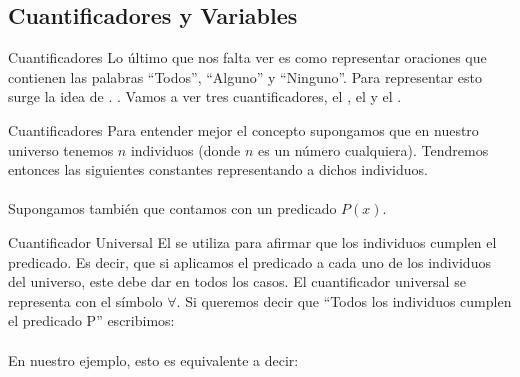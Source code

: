 
\subsection{Cuantificadores y Variables}


\begin{frame}{Cuantificadores}
  Lo último que nos falta ver es como representar oraciones que contienen las
  palabras ``Todos'', ``Alguno'' y ``Ninguno''.
  \jump
  Para representar esto surge la idea de .
  \jump
  .
  \jump
  Vamos a ver tres cuantificadores, el , el
   y el .
\end{frame}


\begin{frame}{Cuantificadores}
  Para entender mejor el concepto supongamos que en nuestro universo tenemos
  $n$ individuos (donde $n$ es un número cualquiera).
  \jump
  Tendremos entonces las siguientes constantes representando a dichos individuos.\\
  \\
  Supongamos también que contamos con un predicado $P(x)$.
\end{frame}


\begin{frame}{Cuantificador Universal}
  El  se utiliza para afirmar que 
  los individuos cumplen el predicado.
  \jump
  Es decir, que si aplicamos el predicado a cada uno de los individuos del universo,
  este debe dar \fulltrue en todos los casos.
  \jump
  El cuantificador universal se representa con el símbolo $\forall$.
  \jump
  Si queremos decir que ``Todos los individuos cumplen el predicado P'' escribimos:\\
  \\
  \jump
  En nuestro ejemplo, esto es equivalente a decir:\\
  \\
\end{frame}

